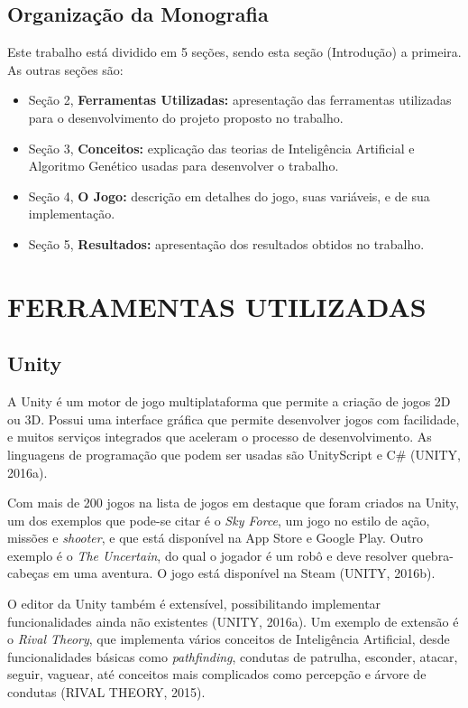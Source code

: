 \documentclass[12pt,a4paper]{article}
\begin{document}
	\FloatBarrier
	\subsection{Organização da Monografia}
		Este trabalho está dividido em 5 seções, sendo esta seção (Introdução) a primeira. As outras seções são:
		\begin{itemize}[noitemsep]
     		\item Seção 2, \textbf{Ferramentas Utilizadas:} apresentação das ferramentas utilizadas para o desenvolvimento do projeto proposto no trabalho.
     		\item Seção 3, \textbf{Conceitos:} explicação das teorias de Inteligência Artificial e Algoritmo Genético usadas para desenvolver o trabalho.
     		\item Seção 4, \textbf{O Jogo:} descrição em detalhes do jogo, suas variáveis, e de sua implementação.
     		\item Seção 5, \textbf{Resultados:} apresentação dos resultados obtidos no trabalho.
  	 	\end{itemize}

\FloatBarrier
\newpage %
\section{FERRAMENTAS UTILIZADAS}

	\FloatBarrier
	\subsection{Unity}
		A Unity é um motor de jogo multiplataforma que permite a criação de jogos 2D ou 3D.
		Possui uma interface gráfica que permite desenvolver jogos com facilidade,
		e muitos serviços integrados que aceleram o processo de desenvolvimento.
		As linguagens de programação que podem ser usadas são UnityScript e C\#
		(UNITY, 2016a).
		
		Com mais de 200 jogos na lista de jogos em destaque que foram criados na Unity,
		um dos exemplos que pode-se citar é o \textit{Sky Force},
		um jogo no estilo de ação, missões e \textit{shooter},
		e que está disponível na App Store e Google Play.
		Outro exemplo é o \textit{The Uncertain},
		do qual o jogador é um robô e
		deve resolver quebra-cabeças em uma aventura.
		O jogo está disponível na Steam
		(UNITY, 2016b).
		
		O editor da Unity também é extensível, possibilitando implementar funcionalidades ainda não existentes
		(UNITY, 2016a).
		Um exemplo de extensão é o \textit{Rival Theory},
		que implementa vários conceitos de Inteligência Artificial,
		desde funcionalidades básicas como \textit{pathfinding},
		condutas de patrulha, esconder, atacar, seguir, vaguear,
		até conceitos mais complicados como percepção e árvore de condutas
		(RIVAL THEORY, 2015).
		
\end{document}
